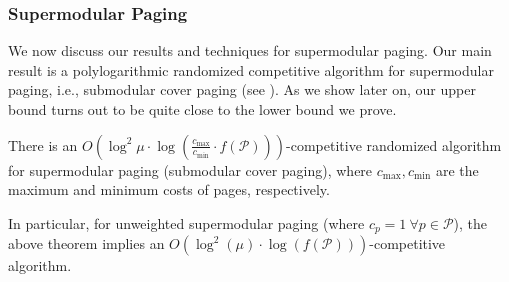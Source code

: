\documentclass[11pt]{article}
\newcommand{\cP}{{\mathcal{P}}}
\begin{document}
%
%
%

\subsubsection{Supermodular Paging} %

We now discuss our results and techniques for supermodular paging. Our main result is a polylogarithmic randomized competitive algorithm for supermodular paging, i.e., submodular cover paging (see ). %
As we show later on, our upper bound turns out to be quite close to the lower bound we prove. 


	\begin{theorem}
	\label{thm:randomized}
There is an $O\left(\log^2 \mu \cdot \log \left(\frac{c_{\max}}{c_{\min}} \cdot f(\cP) \right)\right)$-competitive randomized algorithm for \textnormal{supermodular paging (submodular cover paging)}, where $c_{\max},c_{\min}$ are the maximum and minimum costs of pages, respectively.
\end{theorem}
In particular, for unweighted supermodular paging (where $c_p = 1~\forall p \in \cP$), the above theorem implies an $O\left(\log^2 (\mu) \cdot \log \left(f(\cP) \right)\right)$-competitive algorithm.
\end{document}
